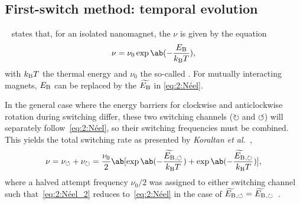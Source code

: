 \subsection{First-switch method: temporal evolution}
~\cite{neel1949theorie} states that, for an isolated nanomagnet, the  $\nu$ is given by the  equation
\begin{equation}
	\nu = \nu_0 \exp\ab(-\frac{\EB}{\kBT}) \mathrm{,}
	\label{eq:2:Néel}
\end{equation}
with $\kBT$ the thermal energy and $\nu_0$ the so-called .
For mutually interacting magnets, $E_\mathrm{B}$ can be replaced by the  $\widetilde{E_\mathrm{B}}$ in \cref{eq:2:Néel}. \par
In the general case where the energy barriers for clockwise and anticlockwise rotation during switching differ, these two switching channels ($\circlearrowright$ and $\circlearrowleft$) will separately follow~\cref{eq:2:Néel}, so their switching frequencies must be combined.
This yields the total switching rate as presented by \textit{Koraltan et al.}~\cite{DirectionalEnergyBarrier},
\begin{equation}
	\nu = \nu_\circlearrowleft + \nu_\circlearrowright = \frac{\nu_0}{2} \ab[\exp\ab(-\frac{\EBeffLeft}{\kBT}) + \exp\ab(-\frac{\EBeffRight}{\kBT})] \mathrm{,}
	\label{eq:2:Néel_2}
\end{equation}
where a halved attempt frequency $\nu_0/2$ was assigned to either switching channel such that~\cref{eq:2:Néel_2} reduces to~\cref{eq:2:Néel} in the case of $\widetilde{E_\mathrm{B}}{}_{,\circlearrowleft}=\widetilde{E_\mathrm{B}}{}_{,\circlearrowright}$~\cite{leo2021chiral}.

